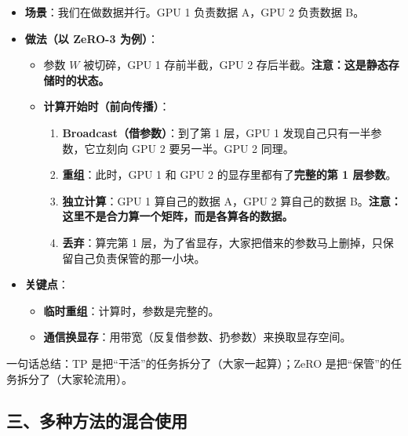 \begin{itemize}
\tightlist
\item
  \textbf{场景}：我们在做数据并行。GPU 1 负责数据 A，GPU 2 负责数据 B。
\item
{}
  \textbf{做法（以 ZeRO-3 为例）}：

  \begin{itemize}
  \tightlist
  \item
    参数 \(W\) 被切碎，GPU 1 存前半截，GPU 2 存后半截。\textbf{注意：这是静态存储时的状态。}
  \item
{}
    \textbf{计算开始时（前向传播）}：

    \begin{enumerate}
    \def\labelenumi{\arabic{enumi}.}
    \tightlist
    \item
      \textbf{Broadcast（借参数）}：到了第 1 层，GPU 1 发现自己只有一半参数，它立刻向 GPU 2 要另一半。GPU 2 同理。
    \item
      \textbf{重组}：此时，GPU 1 和 GPU 2 的显存里都有了\textbf{完整的第 1 层参数}。
    \item
      \textbf{独立计算}：GPU 1 算自己的数据 A，GPU 2 算自己的数据 B。\textbf{注意：这里不是合力算一个矩阵，而是各算各的数据。}
    \item
      \textbf{丢弃}：算完第 1 层，为了省显存，大家把借来的参数马上删掉，只保留自己负责保管的那一小块。
    \end{enumerate}
  \end{itemize}
\item
{}
  \textbf{关键点}：

  \begin{itemize}
  \tightlist
  \item
    \textbf{临时重组}：计算时，参数是完整的。
  \item
    \textbf{通信换显存}：用带宽（反复借参数、扔参数）来换取显存空间。
  \end{itemize}
\end{itemize}

一句话总结：TP 是把``干活''的任务拆分了（大家一起算）；ZeRO 是把``保管''的任务拆分了（大家轮流用）。

\hypertarget{ux4e09ux591aux79cdux65b9ux6cd5ux7684ux6df7ux5408ux4f7fux7528}{%
\subsection{三、多种方法的混合使用}\label{ux4e09ux591aux79cdux65b9ux6cd5ux7684ux6df7ux5408ux4f7fux7528}}

